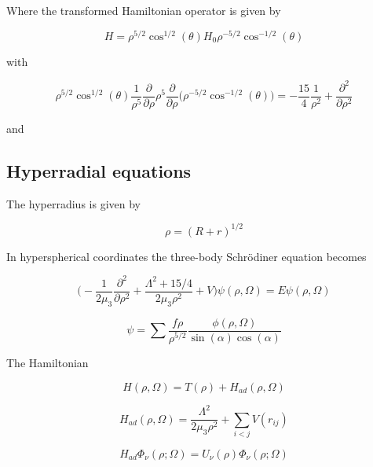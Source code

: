 \documentclass{article}
\begin{document}
Where the transformed Hamiltonian operator is given by

\begin{equation}
H = \rho^{5/2} \cos^{1/2}{(\theta)} H_{0} \rho^{-5/2} \cos^{-1/2}{(\theta)}
\end{equation}

with

\begin{equation}
\rho^{5/2} \cos^{1/2}{(\theta)} \frac{1}{\rho^{5}} \frac{\partial}{\partial \rho} \rho^{5} \frac{\partial}{\partial \rho} \Big( \rho^{-5/2} \cos^{-1/2}{(\theta)} \Big) = -\frac{15}{4} \frac{1}{\rho^{2}} + \frac{\partial^{2}}{\partial \rho^{2}}
\end{equation}

and


\subsection{Hyperradial equations}

The hyperradius is given by

\begin{equation}
\rho = (R + r)^{1/2}
\end{equation}

In hyperspherical coordinates the three-body Schr{\"o}diner equation becomes

\begin{equation}
\Bigg(-\frac{1}{2 \mu_{3}}\frac{\partial^2}{ \partial \rho^2} + \frac{\Lambda^2 + 15/4}{2 \mu_{3} \rho^2} + V \Bigg)\psi(\rho,\Omega) = E\psi(\rho,\Omega)
\end{equation}

\begin{equation}
\psi = \sum \frac{f{\rho}}{\rho^{5/2}} \frac{\phi{(\rho,\Omega)}}{\sin(\alpha) \cos(\alpha)}
\end{equation}

The Hamiltonian

\begin{equation}
H(\rho,\Omega) = T(\rho) + H_{ad}(\rho,\Omega)
\end{equation}

\begin{equation}
H_{ad}(\rho,\Omega) = \frac{\Lambda^2}{2 \mu_{3} \rho^2} + \sum_{i<j} V(r_{ij})
\end{equation}

\begin{equation}
H_{ad} \Phi_{\nu}{(\rho ; \Omega)}= U_{\nu}{(\rho)} \Phi_{\nu}{(\rho ; \Omega)}
\end{equation}
\end{document}
